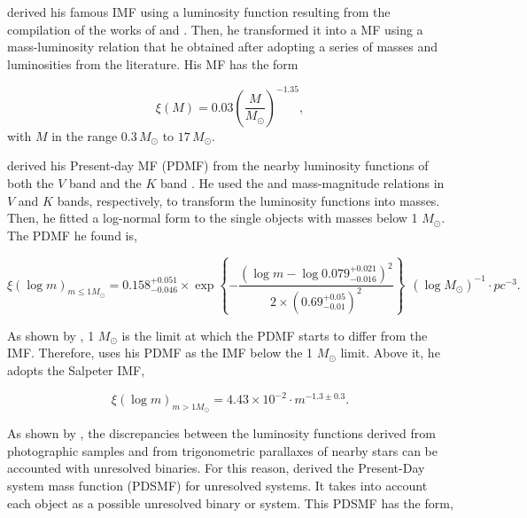 \citet{Salpeter1955} derived his famous IMF using a luminosity function resulting from the compilation of the works of \citet{1939POMin...7....1L,1941NYASA..42..201L} and \citet{1925PGro...38D...1V,1936PGro...47....1V}. Then, he transformed it into a MF using a mass-luminosity relation that he obtained after adopting a series of masses and luminosities from the literature. His MF has the form

\begin{equation}
\xi(M)=0.03 \left(\frac{M}{M_{\odot}}\right)^{-1.35},
\end{equation}
with $M$ in the range $0.3\,M_{\odot}$ to  $17\,M_{\odot}$.

\citet{Chabrier2003a,Chabrier2003b} derived his Present-day MF (PDMF) from the nearby luminosity functions of both the $V$ band \citep{1986AJ.....91..621D} and the $K$ band \citep{1990ApJ...350..334H}. He used the \citet{2000A&A...364..217D} and \citet{1998A&A...337..403B} mass-magnitude relations in $V$ and $K$ bands, respectively, to transform the luminosity functions into masses. Then, he fitted a log-normal form to the single objects with masses below 1 $M_{\odot}$. The PDMF he found is,

\begin{equation}
\xi(\log m)_{m\leq1M_{\odot}}=0.158_{-0.046}^{+0.051} \times \exp{\left\{-\frac{(\log m - \log 0.079_{-0.016}^{+0.021})^2}{2 \times (0.69_{-0.01}^{+0.05})^2}\right\}}\ \ (\log M_{\odot})^{-1}\cdot pc^{-3}.\nonumber
\end{equation}

As shown by \citet{1986FCPh...11....1S}, 1 $M_{\odot}$ is the limit at which the PDMF starts to differ from the IMF. Therefore, \citet{Chabrier2003b} uses his PDMF as the IMF below the 1 $M_{\odot}$ limit. Above it, he adopts the Salpeter IMF,

\begin{equation}
\xi(\log m)_{m>1M_{\odot}}= 4.43\times10^{-2}\cdot m^{-1.3\pm0.3}.\nonumber
\end{equation}

As shown by \citet{1991MNRAS.251..293K}, the discrepancies between the luminosity functions derived from photographic samples and from trigonometric parallaxes of nearby stars can be accounted with unresolved binaries. For this reason, \citet{Chabrier2003a} derived the Present-Day system mass function (PDSMF) for unresolved systems. It takes into account each object as a possible unresolved binary or system. This PDSMF has the form,

